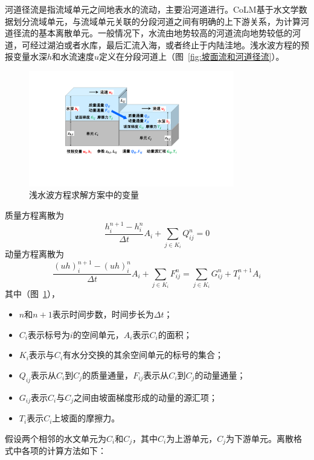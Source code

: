 河道径流是指流域单元之间地表水的流动，主要沿河道进行。CoLM基于水文学数据划分流域单元，与流域单元关联的分段河道之间有明确的上下游关系，为计算河道径流的基本离散单元。一般情况下，水流由地势较高的河道流向地势较低的河道，可经过湖泊或者水库，最后汇流入海，或者终止于内陆洼地。浅水波方程的预报变量水深$h$和水流速度$u$定义在分段河道上（图~\ref{fig:坡面流和河道径流}）。

{
\begin{figure}[htbp]
\centering
\includegraphics[width=0.8\textwidth]{Figures/侧向流/浅水波方程求解.pdf}
\caption{浅水波方程求解方案中的变量}
\label{fig:浅水波方程求解}
\end{figure}
}

 质量方程离散为
  \begin{equation}
 \frac{ h^{n+1}_i - h^n_i}{\Delta t} A_i+\sum_{j\in K_i} Q^n_{ij} = 0
 \end{equation}
 动量方程离散为
 \begin{equation}
 \frac{ \left(uh\right)^{n+1}_i - \left(uh\right)^n_i}{\Delta t} A_i + \sum_{j\in K_i} F^n_{ij} = \sum_{j\in K_i} G^n_{ij}  + T^{n+1}_i  A_i \label{swe-d-2}
  \end{equation}
其中（图~\ref{fig:浅水波方程求解}），
\begin{itemize}
\item $n$和$n+1$表示时间步数，时间步长为$\Delta t$；
\item $C_i$表示标号为$i$的空间单元，$A_i$表示$C_i$的面积；
\item $K_i$表示与$C_i$有水分交换的其余空间单元的标号的集合；
\item $Q_{ij}$表示从$C_i$到$C_j$的质量通量，$F_{ij}$表示从$C_i$到$C_j$的动量通量；
\item $G_{ij}$表示$C_i$与$C_j$之间由坡面梯度形成的动量的源汇项；
\item $T_i$表示$C_i$上坡面的摩擦力。
\end{itemize}

假设两个相邻的水文单元为$C_i$和$C_j$，其中$C_i$为上游单元，$C_j$为下游单元。离散格式中各项的计算方法如下：

